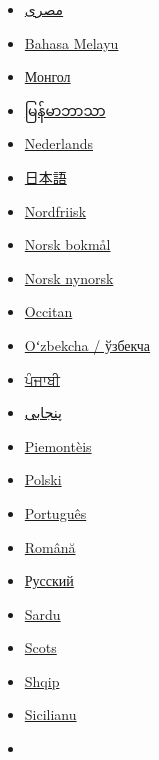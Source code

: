 \documentclass[
]{article}
\begin{document}
\begin{itemize}
\item
  \href{https://arz.wikipedia.org/wiki/\%D8\%AC\%D9\%88\%D9\%84_(\%D8\%B7\%D8\%A7\%D9\%82\%D8\%A9)}{{مصرى}}
\item
  \href{https://ms.wikipedia.org/wiki/Joule}{{Bahasa Melayu}}
\item
  \href{https://mn.wikipedia.org/wiki/\%D0\%96\%D0\%BE\%D1\%83\%D0\%BB\%D1\%8C}{{Монгол}}
\item
  \href{https://my.wikipedia.org/wiki/\%E1\%80\%82\%E1\%80\%BB\%E1\%80\%AD\%E1\%80\%AF\%E1\%80\%B8}{{မြန်မာဘာသာ}}
\item
  \href{https://nl.wikipedia.org/wiki/Joule}{{Nederlands}}
\item
  \href{https://ja.wikipedia.org/wiki/\%E3\%82\%B8\%E3\%83\%A5\%E3\%83\%BC\%E3\%83\%AB}{{日本語}}
\item
  \href{https://frr.wikipedia.org/wiki/Joule_(ianhaid)}{{Nordfriisk}}
\item
  \href{https://no.wikipedia.org/wiki/Joule}{{Norsk bokmål}}
\item
  \href{https://nn.wikipedia.org/wiki/Joule}{{Norsk nynorsk}}
\item
  \href{https://oc.wikipedia.org/wiki/Joule}{{Occitan}}
\item
  \href{https://uz.wikipedia.org/wiki/Joul}{{Oʻzbekcha / ўзбекча}}
\item
  \href{https://pa.wikipedia.org/wiki/\%E0\%A8\%9C\%E0\%A9\%82\%E0\%A8\%B2}{{ਪੰਜਾਬੀ}}
\item
  \href{https://pnb.wikipedia.org/wiki/\%D8\%AC\%D8\%A7\%D8\%A4\%D9\%84}{{پنجابی}}
\item
  \href{https://pms.wikipedia.org/wiki/Joule}{{Piemontèis}}
\item
  \href{https://pl.wikipedia.org/wiki/D\%C5\%BCul}{{Polski}}
\item
  \href{https://pt.wikipedia.org/wiki/Joule}{{Português}}
\item
  \href{https://ro.wikipedia.org/wiki/Joule}{{Română}}
\item
  \href{https://ru.wikipedia.org/wiki/\%D0\%94\%D0\%B6\%D0\%BE\%D1\%83\%D0\%BB\%D1\%8C}{{Русский}}
\item
  \href{https://sc.wikipedia.org/wiki/Joule}{{Sardu}}
\item
  \href{https://sco.wikipedia.org/wiki/Joule}{{Scots}}
\item
  \href{https://sq.wikipedia.org/wiki/Xhaul}{{Shqip}}
\item
  \href{https://scn.wikipedia.org/wiki/Joule}{{Sicilianu}}
\item

\end{itemize}
\end{document}
